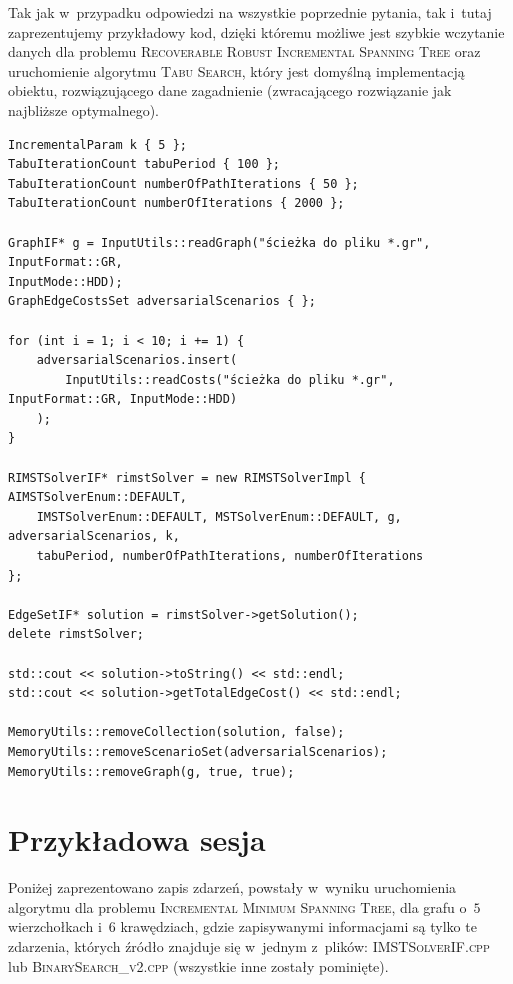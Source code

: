 Tak jak w~przypadku odpowiedzi na wszystkie poprzednie pytania, tak i~tutaj zaprezentujemy przykładowy kod, dzięki któremu możliwe jest szybkie wczytanie danych dla problemu \textsc{Recoverable Robust Incremental Spanning Tree} oraz uruchomienie algorytmu \textsc{Tabu Search}, który jest domyślną implementacją obiektu, rozwiązującego dane zagadnienie (zwracającego rozwiązanie jak najbliższe optymalnego).

\begin{verbatim}
IncrementalParam k { 5 };
TabuIterationCount tabuPeriod { 100 };
TabuIterationCount numberOfPathIterations { 50 };
TabuIterationCount numberOfIterations { 2000 };

GraphIF* g = InputUtils::readGraph("ścieżka do pliku *.gr", InputFormat::GR,
InputMode::HDD);
GraphEdgeCostsSet adversarialScenarios { };

for (int i = 1; i < 10; i += 1) {
	adversarialScenarios.insert(
		InputUtils::readCosts("ścieżka do pliku *.gr", InputFormat::GR, InputMode::HDD)
	);
}

RIMSTSolverIF* rimstSolver = new RIMSTSolverImpl { AIMSTSolverEnum::DEFAULT,
	IMSTSolverEnum::DEFAULT, MSTSolverEnum::DEFAULT, g, adversarialScenarios, k, 
	tabuPeriod, numberOfPathIterations, numberOfIterations
};

EdgeSetIF* solution = rimstSolver->getSolution();
delete rimstSolver;

std::cout << solution->toString() << std::endl;
std::cout << solution->getTotalEdgeCost() << std::endl;

MemoryUtils::removeCollection(solution, false);
MemoryUtils::removeScenarioSet(adversarialScenarios);
MemoryUtils::removeGraph(g, true, true);
\end{verbatim}




\section{Przykładowa sesja}\label{sec:logging}




Poniżej zaprezentowano zapis zdarzeń, powstały w~wyniku uruchomienia algorytmu dla problemu \textsc{Incremental Minimum Spanning Tree}, dla grafu o~$5$ wierzchołkach i~$6$ krawędziach, gdzie zapisywanymi informacjami są tylko te zdarzenia, których źródło znajduje się w~jednym z~plików: \textsc{IMSTSolverIF.cpp} lub \textsc{BinarySearch\_v2.cpp} (wszystkie inne zostały pominięte).

